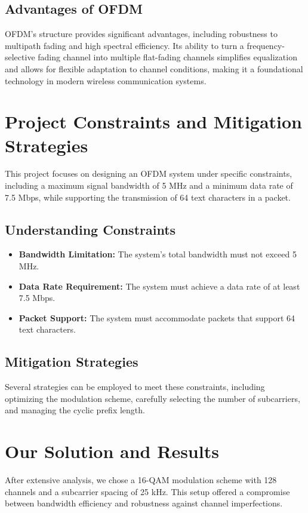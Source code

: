 \documentclass{article}
\begin{document}
\subsection*{Advantages of OFDM}
OFDM's structure provides significant advantages, including robustness to multipath fading and high spectral efficiency. Its ability to turn a frequency-selective fading channel into multiple flat-fading channels simplifies equalization and allows for flexible adaptation to channel conditions, making it a foundational technology in modern wireless communication systems.


\section*{Project Constraints and Mitigation Strategies}
This project focuses on designing an OFDM system under specific constraints, including a maximum signal bandwidth of 5 MHz and a minimum data rate of 7.5 Mbps, while supporting the transmission of 64 text characters in a packet.

\subsection*{Understanding Constraints}
\begin{itemize}
    \item \textbf{Bandwidth Limitation:} The system's total bandwidth must not exceed 5 MHz.
    \item \textbf{Data Rate Requirement:} The system must achieve a data rate of at least 7.5 Mbps.
    \item \textbf{Packet Support:} The system must accommodate packets that support 64 text characters.
\end{itemize}

\subsection*{Mitigation Strategies}
Several strategies can be employed to meet these constraints, including optimizing the modulation scheme, carefully selecting the number of subcarriers, and managing the cyclic prefix length.

\section*{Our Solution and Results}
After extensive analysis, we chose a 16-QAM modulation scheme with 128 channels and a subcarrier spacing of 25 kHz. This setup offered a compromise between bandwidth efficiency and robustness against channel imperfections.
\end{document}
